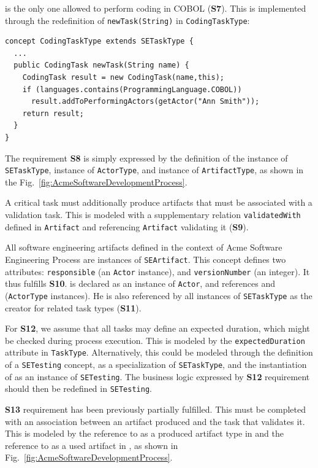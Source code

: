  is the only one allowed to perform coding in COBOL (\textbf{S7}). This is implemented through the redefinition of \texttt{newTask(String)} in \texttt{CodingTaskType}:

\begin{lstlisting}
concept CodingTaskType extends SETaskType {
  ...
  public CodingTask newTask(String name) {
    CodingTask result = new CodingTask(name,this);
    if (languages.contains(ProgrammingLanguage.COBOL))
      result.addToPerformingActors(getActor("Ann Smith"));
    return result;
  }
}
\end{lstlisting}

The requirement \textbf{S8} is simply expressed by the definition of the
 instance of \texttt{SETaskType},  instance of
\texttt{ActorType}, and  instance of \texttt{ArtifactType},
as shown in the Fig.~\ref{fig:AcmeSoftwareDevelopmentProcess}.

A critical task must additionally produce artifacts that must be associated
with a validation task. This is modeled with a supplementary relation
\texttt{validatedWith} defined in \texttt{Artifact} and referencing
\texttt{Artifact} validating it (\textbf{S9}).

All software engineering artifacts defined in the context of Acme Software
Engineering Process are  instances of \texttt{SEArtifact}. This concept defines
two attributes: \texttt{responsible} (an \texttt{Actor} instance), and
\texttt{versionNumber} (an integer). It thus fulfills \textbf{S10}.  is declared as an instance of \texttt{Actor}, and references
 and  (\texttt{ActorType} instances). He is also
referenced by all instances of \texttt{SETaskType} as the creator for related
task types (\textbf{S11}).

For \textbf{S12}, we assume that all tasks may define an expected duration,
which might be checked during process execution. This is modeled by the
\texttt{expectedDuration} attribute in \texttt{TaskType}. Alternatively, this
could be modeled through the definition of a \texttt{SETesting} concept, as a
specialization of \texttt{SETaskType}, and the instantiation of 
as an instance of \texttt{SETesting}. The business logic expressed by
\textbf{S12} requirement should then be redefined in \texttt{SETesting}.

\textbf{S13} requirement has been previously partially fulfilled. This must be
completed with an association between an artifact produced and the task that
validates it. This is modeled by the reference to  as a
produced artifact type in  and the reference to
 as a used artifact in , as shown in
Fig.~\ref{fig:AcmeSoftwareDevelopmentProcess}.

